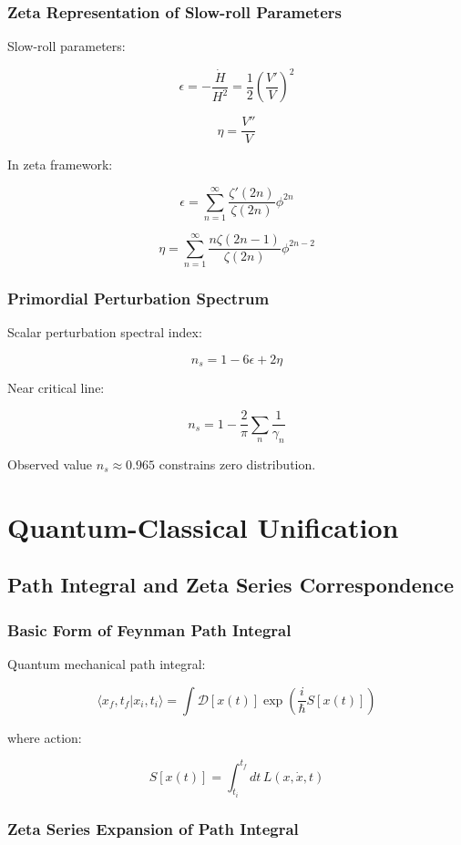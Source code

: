 \documentclass[12pt,a4paper]{article}
\begin{document}
\subsubsection{Zeta Representation of Slow-roll Parameters}

Slow-roll parameters:

$$\epsilon = -\frac{\dot{H}}{H^2} = \frac{1}{2} \left(\frac{V'}{V}\right)^2$$

$$\eta = \frac{V''}{V}$$

In zeta framework:

$$\epsilon = \sum_{n=1}^{\infty} \frac{\zeta'(2n)}{\zeta(2n)} \phi^{2n}$$

$$\eta = \sum_{n=1}^{\infty} \frac{n \zeta(2n-1)}{\zeta(2n)} \phi^{2n-2}$$

\subsubsection{Primordial Perturbation Spectrum}

Scalar perturbation spectral index:

$$n_s = 1 - 6\epsilon + 2\eta$$

Near critical line:

$$n_s = 1 - \frac{2}{\pi} \sum_{n} \frac{1}{\gamma_n}$$

Observed value $n_s \approx 0.965$ constrains zero distribution.

\section{Quantum-Classical Unification}

\subsection{Path Integral and Zeta Series Correspondence}

\subsubsection{Basic Form of Feynman Path Integral}

Quantum mechanical path integral:

$$\langle x_f, t_f | x_i, t_i \rangle = \int \mathcal{D}[x(t)] \exp\left(\frac{i}{\hbar} S[x(t)]\right)$$

where action:

$$S[x(t)] = \int_{t_i}^{t_f} dt \, L(x, \dot{x}, t)$$

\subsubsection{Zeta Series Expansion of Path Integral}
\end{document}
